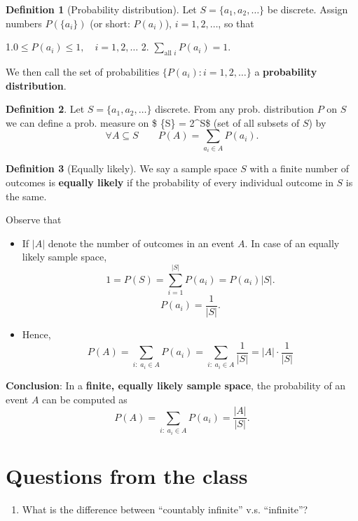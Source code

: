 \documentclass[
]{book}
\providecommand{\tightlist}{%
  \setlength{\itemsep}{0pt}\setlength{\parskip}{0pt}}
\theoremstyle{definition}
\newtheorem{definition}{Definition}[chapter]
\theoremstyle{definition}
\theoremstyle{definition}
\theoremstyle{definition}
\theoremstyle{remark}
\begin{document}
\begin{definition}[Probability distribution]
Let \(S=\{a_1,a_2,\dots\}\) be discrete. Assign numbers \(P(\{a_i\})\) (or short: \(P(a_i)\)), \(i=1,2,\dots\), so that

1.\(0\leq P(a_i)\leq 1,\quad i=1,2,\dots\)
2. \(\sum_{\text{all }i}P(a_i)=1\).

We then call the set of probabilities \(\{P(a_i):i=1,2,\dots\}\) a \textbf{probability distribution}.
\end{definition}

\begin{definition}
Let \(S=\{a_1,a_2,\dots\}\) discrete. From any prob. distribution \(P\) on \(S\) we can define a prob. measure on \$ \{\mathcal S\} = 2\^{}S\$ (set of all subsets of \(S\)) by
\[\forall A \subseteq S \qquad P(A)=\sum_{a_i\in A}P(a_i).\]
\end{definition}

\begin{definition}[Equally likely]
We say a sample space \(S\) with a finite number of outcomes is \textbf{equally likely} if the probability of every individual outcome in \(S\) is the same.
\end{definition}

Observe that

\begin{itemize}
\item
  If \(|A|\) denote the number of outcomes in an event \(A\). In case of an equally likely sample space,
  \[
  1=P(S)=\sum_{i=1}^{|S|}P(a_{i})= P(a_i)|S|.
  \]
  \[
  P(a_i)=\frac{1}{|S|}.
  \]
\item
  Hence,
  \[P(A) = \sum_{i:\;a_i \in A} P(a_i) = \sum_{i:\;a_i \in A} \frac{1}{|S|} =|A|\cdot  \frac{1}{|S|}\]
\end{itemize}

\textbf{Conclusion}: In a \textbf{finite, equally likely sample space}, the probability of an event \(A\) can be computed as
\[
P(A) = \sum_{i:\;a_i \in A} P(a_i) = \frac{|A|}{|S|}.
\]

\section{Questions from the class}\label{questions-from-the-class}

\begin{enumerate}
\def\labelenumi{\arabic{enumi}.}
\tightlist
\item
  What is the difference between ``countably infinite'' v.s. ``infinite''?
\end{enumerate}
\end{document}
